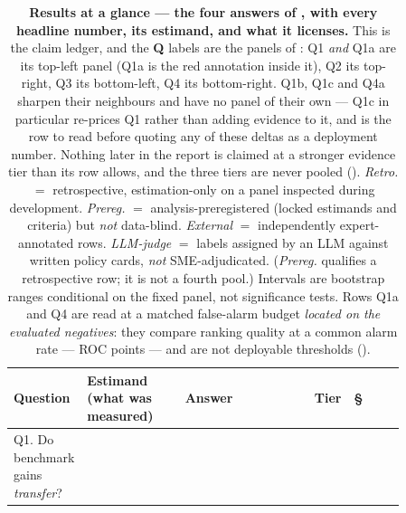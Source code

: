 \documentclass[11pt]{article}
\begin{document}
\begin{table}[H]\centering\footnotesize
\caption{\textbf{Results at a glance --- the four answers of , with every headline
number, its estimand, and what it licenses.} This is the claim ledger, and the \textbf{Q} labels are
the panels of : Q1 \emph{and} Q1a are its top-left panel (Q1a is the red annotation
inside it), Q2 its top-right, Q3 its bottom-left, Q4 its bottom-right. Q1b, Q1c and Q4a sharpen their
neighbours and have no panel of their own --- Q1c in particular re-prices Q1 rather than adding
evidence to it, and is the row to read before quoting any of these deltas as a deployment number. Nothing later in the report is claimed at a stronger
evidence tier than its row allows, and the three tiers are never pooled ().
\emph{Retro.} $=$ retrospective, estimation-only on a panel inspected during development.
\emph{Prereg.} $=$ analysis-preregistered (locked estimands and criteria) but \emph{not} data-blind.
\emph{External} $=$ independently expert-annotated rows. \emph{LLM-judge} $=$ labels assigned by an
LLM against written policy cards, \emph{not} SME-adjudicated. (\emph{Prereg.} qualifies a retrospective
row; it is not a fourth pool.) Intervals are bootstrap ranges conditional on the fixed panel, not
significance tests. Rows Q1a and Q4 are read at a matched false-alarm budget \emph{located on the
evaluated negatives}: they compare ranking quality at a common alarm rate --- ROC points --- and are not
deployable thresholds ().}
\label{tab:glance}
\setlength{\tabcolsep}{4pt}\renewcommand{\arraystretch}{1.18}
\begin{tabular}{@{}>{\raggedright\arraybackslash}p{0.185\linewidth}
                  >{\raggedright\arraybackslash}p{0.255\linewidth}
                  >{\raggedright\arraybackslash}p{0.335\linewidth}
                  >{\raggedright\arraybackslash}p{0.085\linewidth}l@{}}
\toprule
\textbf{Question} & \textbf{Estimand (what was measured)} & \textbf{Answer} & \textbf{Tier} & \textbf{\S} \\
\midrule
Q1. Do benchmark gains \emph{transfer}? &

\end{tabular}
\end{table}
\end{document}
